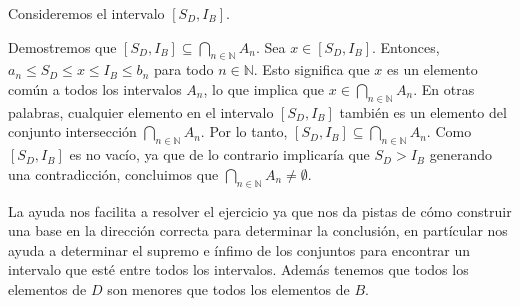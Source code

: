 \documentclass{report}
\begin{document}
            Consideremos el intervalo $[S_D, I_B]$.

            Demostremos que $[S_D, I_B] \subseteq \bigcap_{n \in \mathbb{N}} A_n$. Sea $x \in [S_D, I_B]$. Entonces, $a_n \leq S_D \leq x \leq I_B \leq b_n$ para todo $n \in \mathbb{N}$. Esto significa que $x$ es un elemento común a todos los intervalos $A_n$, lo que implica que $x \in \bigcap_{n \in \mathbb{N}} A_n$. En otras palabras, cualquier elemento en el intervalo $[S_D, I_B]$ también es un elemento del conjunto intersección $\bigcap_{n \in \mathbb{N}} A_n$. Por lo tanto, $[S_D, I_B] \subseteq \bigcap_{n \in \mathbb{N}} A_n$. Como $[S_D, I_B]$ es no vacío, ya que de lo contrario implicaría que $S_D > I_B$ generando una contradicción, concluimos que $\bigcap_{n \in \mathbb{N}} A_n \neq \emptyset$.

            La ayuda nos facilita a resolver el ejercicio ya que nos da pistas de cómo construir una base en la dirección correcta para determinar la conclusión, en partícular nos ayuda a determinar el supremo e ínfimo de los conjuntos para encontrar un intervalo que esté entre todos los intervalos. Además tenemos que todos los elementos de $D$ son menores que todos los elementos de $B$. 
\end{document}
